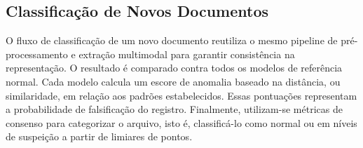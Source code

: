 \documentclass[12pt]{article}
\begin{document}
\subsection{Classificação de Novos Documentos}

O fluxo de classificação de um novo documento reutiliza o mesmo pipeline de pré-processamento e extração multimodal para garantir consistência na representação. O resultado é comparado contra todos os modelos de referência normal. Cada modelo calcula um escore de anomalia baseado na distância, ou similaridade, em relação aos padrões estabelecidos. Essas pontuações representam a probabilidade de falsificação do registro. Finalmente, utilizam-se métricas de consenso para categorizar o arquivo, isto é, classificá-lo como normal ou em níveis de suspeição a partir de limiares de pontos.



\end{document}
